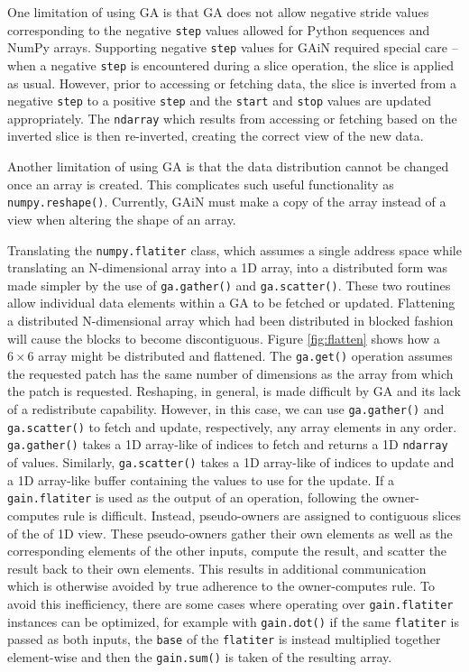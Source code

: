 \documentclass{sigplanconf}
\begin{document}
One limitation of using GA is that GA does not allow negative stride values
corresponding to the negative \verb=step= values allowed for Python sequences
and NumPy arrays. Supporting negative \verb=step= values for GAiN required
special care -- when a negative \verb=step= is encountered during a slice
operation, the slice is applied as usual. However, prior to accessing or
fetching data, the slice is inverted from a negative \verb=step= to a positive
\verb=step= and the \verb=start= and \verb=stop= values are updated
appropriately. The \verb=ndarray= which results from accessing or fetching
based on the inverted slice is then re-inverted, creating the correct view of
the new data.

Another limitation of using GA is that the data distribution cannot be changed
once an array is created. This complicates such useful functionality as
\verb=numpy.reshape()=. Currently, GAiN must make a copy of the array instead
of a view when altering the shape of an array.

Translating the \verb=numpy.flatiter= class, which assumes a single address
space while translating an N-dimensional array into a 1D array, into a
distributed form was made simpler by the use of \verb=ga.gather()= and
\verb=ga.scatter()=. These two routines allow individual data elements within
a GA to be fetched or updated.  Flattening a distributed N-dimensional array
which had been distributed in blocked fashion will cause the blocks to become
discontiguous. Figure \ref{fig:flatten} shows how a $6 \times 6$ array
might be distributed and flattened.  The \verb=ga.get()= operation assumes the
requested patch has the same number of dimensions as the array from which the
patch is requested. Reshaping, in general, is made difficult by GA and its
lack of a redistribute capability.  However, in this case, we can use
\verb=ga.gather()= and \verb=ga.scatter()= to fetch and update, respectively,
any array elements in any order.  \verb=ga.gather()= takes a 1D array-like of
indices to fetch and returns a 1D \verb=ndarray= of values. Similarly,
\verb=ga.scatter()= takes a 1D array-like of indices to update and a 1D
array-like buffer containing the values to use for the update. If a
\verb=gain.flatiter= is used as the output of an operation, following the
owner-computes rule is difficult. Instead, pseudo-owners are assigned to
contiguous slices of the of 1D view. These pseudo-owners gather their own
elements as well as the corresponding elements of the other inputs, compute
the result, and scatter the result back to their own elements. This results in
additional communication which is otherwise avoided by true adherence to the
owner-computes rule. To avoid this inefficiency, there are some cases where
operating over \verb=gain.flatiter= instances can be optimized, for example
with \verb=gain.dot()= if the same \verb=flatiter= is passed as both inputs,
the \verb=base= of the \verb=flatiter= is instead multiplied together
element-wise and then the \verb=gain.sum()= is taken of the resulting array.
\end{document}
